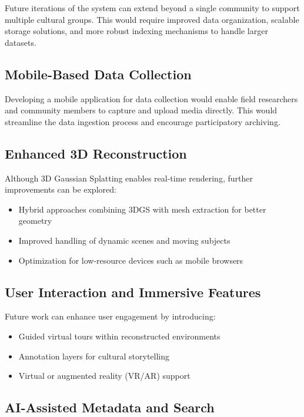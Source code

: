 Future iterations of the system can extend beyond a single community to support multiple cultural groups. This would require improved data organization, scalable storage solutions, and more robust indexing mechanisms to handle larger datasets.

\subsection{Mobile-Based Data Collection}

Developing a mobile application for data collection would enable field researchers and community members to capture and upload media directly. This would streamline the data ingestion process and encourage participatory archiving.

\subsection{Enhanced 3D Reconstruction}

Although 3D Gaussian Splatting enables real-time rendering, further improvements can be explored:
\begin{itemize}
    \item Hybrid approaches combining 3DGS with mesh extraction for better geometry
    \item Improved handling of dynamic scenes and moving subjects
    \item Optimization for low-resource devices such as mobile browsers
\end{itemize}

\subsection{User Interaction and Immersive Features}

Future work can enhance user engagement by introducing:
\begin{itemize}
    \item Guided virtual tours within reconstructed environments
    \item Annotation layers for cultural storytelling
    \item Virtual or augmented reality (VR/AR) support
\end{itemize}

\subsection{AI-Assisted Metadata and Search}

